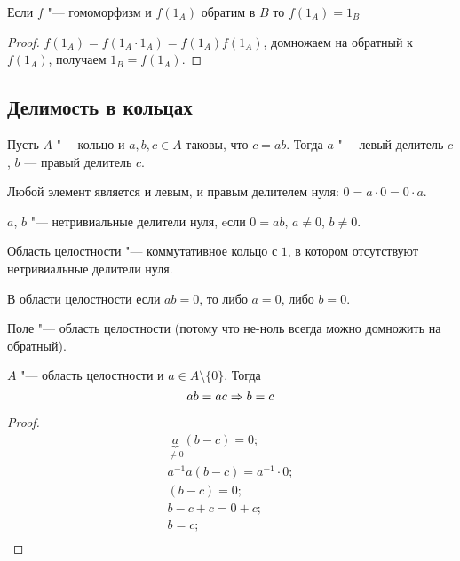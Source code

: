\begin{Rem}
	Если $f$ "--- гомоморфизм и $f(1_A)$ обратим в $B$ то $f(1_A)=1_B$
\end{Rem}
\begin{proof}
	$f(1_A) = f(1_A \cdot 1_A) = f(1_A)f(1_A)$, домножаем на обратный к $f(1_A)$,
	получаем $1_B = f(1_A)$.
\end{proof}
	
\subsection{Делимость в кольцах}

\begin{Def}
Пусть $A$ "--- кольцо и $a, b, c \in A$ таковы, что $c = ab$.
Тогда $a$ "--- левый делитель $c$, $b$ --- правый делитель $c$.
\end{Def}

\begin{Rem}
Любой элемент является и левым, и правым делителем нуля: $0 = a \cdot 0 = 0 \cdot a$.
\end{Rem}
    
\begin{Def}
	$a$, $b$ "--- нетривиальные делители нуля, eсли $0 = ab$, $a \neq 0$, $b \neq 0$.
\end{Def}
	
\begin{Def}	
	Область целостности "--- коммутативное кольцо с $1$, в котором отсутствуют нетривиальные делители нуля.
\end{Def}

\begin{Rem}
    В области целостности если $ab=0$, то либо $a=0$, либо $b=0$.
\end{Rem}
\begin{Rem}
	Поле "--- область целостности (потому что не-ноль всегда можно домножить на обратный).
\end{Rem}
	
\begin{theorem}{}
	$A$ "--- область целостности и $a \in A \setminus \{ 0 \}$. Тогда
	\[ab = ac \Rightarrow b = c\]
\end{theorem}
	
\begin{proof}
	\begin{gather*}
	\underbrace{a}_{\neq 0}(b - c) = 0; \\
	a^{-1}a(b - c) = a^{-1} \cdot 0; \\
	(b - c) = 0; \\
	b - c + c = 0 + c; \\
	b = c; \\
	\end{gather*}
\end{proof}
